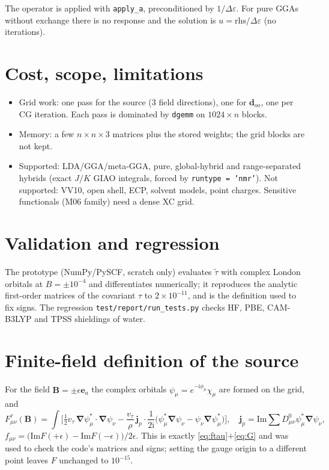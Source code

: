 \documentclass[11pt,a4paper]{article}
\newcommand{\grad}{\bm{\nabla}}
\newcommand{\jp}{\bm{j}_p}
\newcommand{\vt}{v_\tau}
\newcommand{\ttil}{\tilde\tau}
\newcommand{\ci}{\mathrm{i}}
\begin{document}
The operator is applied with \texttt{apply\_a}, preconditioned by $1/\Delta\varepsilon$. For pure GGAs without exchange there is no response and the solution is $u=\mathrm{rhs}/\Delta\varepsilon$ (no iterations).

\section{Cost, scope, limitations}

\begin{itemize}
\item Grid work: one pass for the source (3 field directions), one for $\bm d_{oo}$, one per CG iteration. Each pass is dominated by \texttt{dgemm} on $1024\times n$ blocks.
\item Memory: a few $n\times n\times3$ matrices plus the stored weights; the grid blocks are not kept.
\item Supported: LDA/GGA/meta-GGA, pure, global-hybrid and range-separated hybrids (exact $J/K$ GIAO integrals, forced by \texttt{runtype = 'nmr'}). Not supported: VV10, open shell, ECP, solvent models, point charges. Sensitive functionals (M06 family) need a dense XC grid.
\end{itemize}

\section{Validation and regression}

The prototype (NumPy/PySCF, scratch only) evaluates $\ttil$ with complex London orbitals at $B=\pm10^{-4}$ and differentiates numerically; it reproduces the analytic first-order matrices of the covariant $\tau$ to $2\times10^{-11}$, and is the definition used to fix signs. The regression \texttt{test/report/run\_tests.py} checks HF, PBE, CAM-B3LYP and TPSS shieldings of water.

\appendix
\section{Finite-field definition of the source}\label{app:fd}

For the field $\bm B=\pm\epsilon\bm e_a$ the complex orbitals $\psi_\mu=e^{-\ci\phi_\mu}\chi_\mu$ are formed on the grid, and
\[
F^{\tau}_{\mu\nu}(\bm B)=\int\Big[\tfrac12\vt\,\grad\psi_\mu^*\!\cdot\!\grad\psi_\nu-\frac{\vt}{\rho}\,\jp\cdot\frac{1}{2\ci}\big(\psi_\mu^*\grad\psi_\nu-\psi_\nu\grad\psi_\mu^*\big)\Big],\quad
\jp=\mathrm{Im}\sum D^0_{\mu\nu}\psi_\mu^*\grad\psi_\nu ,
\]
$f_{\mu\nu}=\big(\mathrm{Im}F(+\epsilon)-\mathrm{Im}F(-\epsilon)\big)/2\epsilon$. This is exactly \eqref{eq:ftau}$+$\eqref{eq:G} and was used to check the code's matrices and signs; setting the gauge origin to a different point leaves $F$ unchanged to $10^{-15}$.
\end{document}
